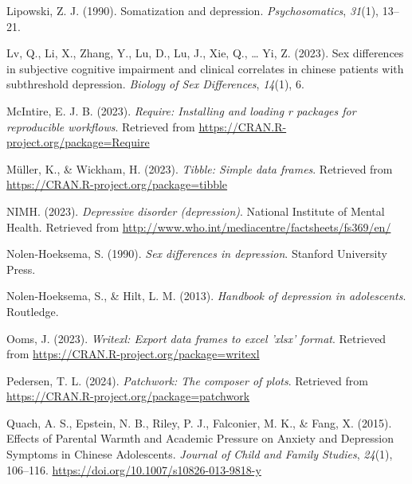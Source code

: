 \documentclass[
  man,floatsintext]{apa6}
\newlength{\cslhangindent}
\newlength{\cslentryspacingunit} %
\newenvironment{CSLReferences}[2] %
 {%
  \setlength{\parindent}{0pt}
  \ifodd #1
  \let\oldpar\par
  \def\par{\hangindent=\cslhangindent\oldpar}
  \fi
  \setlength{\parskip}{#2\cslentryspacingunit}
 }%
 {}
\begin{document}
\begin{CSLReferences}{1}{0}
\leavevmode{}%
Lipowski, Z. J. (1990). Somatization and depression. \emph{Psychosomatics}, \emph{31}(1), 13--21.

\leavevmode{}%
Lv, Q., Li, X., Zhang, Y., Lu, D., Lu, J., Xie, Q., \ldots{} Yi, Z. (2023). Sex differences in subjective cognitive impairment and clinical correlates in chinese patients with subthreshold depression. \emph{Biology of Sex Differences}, \emph{14}(1), 6.

\leavevmode{}%
McIntire, E. J. B. (2023). \emph{Require: Installing and loading r packages for reproducible workflows}. Retrieved from \url{https://CRAN.R-project.org/package=Require}

\leavevmode{}%
Müller, K., \& Wickham, H. (2023). \emph{Tibble: Simple data frames}. Retrieved from \url{https://CRAN.R-project.org/package=tibble}

\leavevmode{}%
NIMH. (2023). \emph{Depressive disorder (depression)}. National Institute of Mental Health. Retrieved from \url{http://www.who.int/mediacentre/factsheets/fs369/en/}

\leavevmode{}%
Nolen-Hoeksema, S. (1990). \emph{Sex differences in depression}. Stanford University Press.

\leavevmode{}%
Nolen-Hoeksema, S., \& Hilt, L. M. (2013). \emph{Handbook of depression in adolescents}. Routledge.

\leavevmode{}%
Ooms, J. (2023). \emph{Writexl: Export data frames to excel 'xlsx' format}. Retrieved from \url{https://CRAN.R-project.org/package=writexl}

\leavevmode{}%
Pedersen, T. L. (2024). \emph{Patchwork: The composer of plots}. Retrieved from \url{https://CRAN.R-project.org/package=patchwork}

\leavevmode{}%
Quach, A. S., Epstein, N. B., Riley, P. J., Falconier, M. K., \& Fang, X. (2015). Effects of {Parental} {Warmth} and {Academic} {Pressure} on {Anxiety} and {Depression} {Symptoms} in {Chinese} {Adolescents}. \emph{Journal of Child and Family Studies}, \emph{24}(1), 106--116. \url{https://doi.org/10.1007/s10826-013-9818-y}


\end{CSLReferences}
\end{document}
